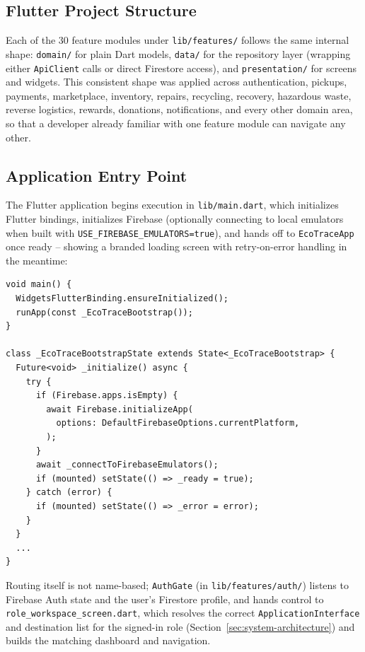 \subsection{Flutter Project Structure}
Each of the 30 feature modules under \texttt{lib/features/} follows the same
internal shape: \texttt{domain/} for plain Dart models, \texttt{data/} for the
repository layer (wrapping either \texttt{ApiClient} calls or direct Firestore
access), and \texttt{presentation/} for screens and widgets. This consistent
shape was applied across authentication, pickups, payments, marketplace,
inventory, repairs, recycling, recovery, hazardous waste, reverse logistics,
rewards, donations, notifications, and every other domain area, so that a
developer already familiar with one feature module can navigate any other.

\subsection{Application Entry Point}
The Flutter application begins execution in \texttt{lib/main.dart}, which
initializes Flutter bindings, initializes Firebase (optionally connecting to
local emulators when built with \texttt{USE\_FIREBASE\_EMULATORS=true}),
and hands off to \texttt{EcoTraceApp} once ready -- showing a branded
loading screen with retry-on-error handling in the meantime:

\begin{verbatim}
void main() {
  WidgetsFlutterBinding.ensureInitialized();
  runApp(const _EcoTraceBootstrap());
}

class _EcoTraceBootstrapState extends State<_EcoTraceBootstrap> {
  Future<void> _initialize() async {
    try {
      if (Firebase.apps.isEmpty) {
        await Firebase.initializeApp(
          options: DefaultFirebaseOptions.currentPlatform,
        );
      }
      await _connectToFirebaseEmulators();
      if (mounted) setState(() => _ready = true);
    } catch (error) {
      if (mounted) setState(() => _error = error);
    }
  }
  ...
}
\end{verbatim}

Routing itself is not name-based; \texttt{AuthGate} (in
\texttt{lib/features/auth/}) listens to Firebase Auth state and the user's
Firestore profile, and hands control to \texttt{role\_workspace\_screen.dart},
which resolves the correct \texttt{ApplicationInterface} and destination list for
the signed-in role (Section~\ref{sec:system-architecture}) and builds the
matching dashboard and navigation.

